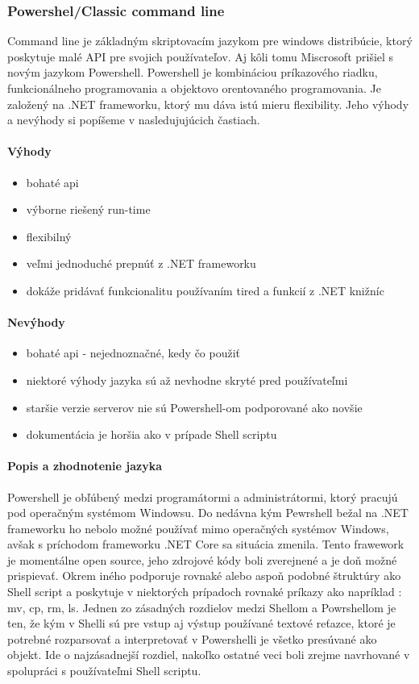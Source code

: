 \subsubsection{Powershel/Classic command line}
\indent  
Command line je základným skriptovacím jazykom pre windows distribúcie, ktorý poskytuje malé API  pre svojich používateľov. Aj kôli tomu Miscrosoft prišiel s novým jazykom Powershell. Powershell je kombináciou príkazového riadku, funkcionálneho programovania a objektovo orentovaného programovania. Je založený na .NET frameworku, ktorý mu dáva istú mieru flexibility. 
Jeho výhody a nevýhody si popíšeme v nasledujujúcich častiach.

\paragraph{Výhody}
\begin{itemize}
	\item bohaté api
	\item výborne riešený run-time 
	\item flexibilný
	\item veľmi jednoduché prepnúť z .NET frameworku
	\item dokáže pridávať funkcionalitu používaním tired a funkcií z .NET knižníc
	\newline 
\end{itemize}
\paragraph{Nevýhody}
\begin{itemize}
	\item bohaté api - nejednoznačné, kedy čo použiť
	\item niektoré výhody jazyka sú až nevhodne skryté pred používateľmi
	\item staršie verzie serverov nie sú Powershell-om podporované ako novšie
	\item dokumentácia je horšia ako v prípade Shell scriptu
	\newline
\end{itemize}

\paragraph{Popis a zhodnotenie jazyka}
Powershell je obľúbený medzi programátormi a administrátormi, ktorý pracujú pod operačným systémom Windowsu. Do nedávna kým Pewrshell bežal na .NET frameworku ho nebolo možné používať mimo operačných systémov Windows, avšak s príchodom frameworku .NET Core sa situácia zmenila. Tento frawework je momentálne open source, jeho zdrojové kódy boli zverejnené a je doň možné prispievať. Okrem iného podporuje rovnaké alebo aspoň podobné štruktúry ako Shell script a poskytuje v niektorých prípadoch rovnaké príkazy ako napríklad : mv, cp, rm, ls. Jednen zo zásadných rozdielov medzi Shellom a Powrshellom je ten, že kým v Shelli sú pre vstup aj výstup používané textové reťazce, ktoré je potrebné rozparsovať a interpretovať v Powershelli je všetko presúvané ako objekt. Ide o najzásadnejší rozdiel, nakoľko ostatné veci boli zrejme navrhované v spolupráci s používateľmi Shell scriptu. \cite{psbook}

